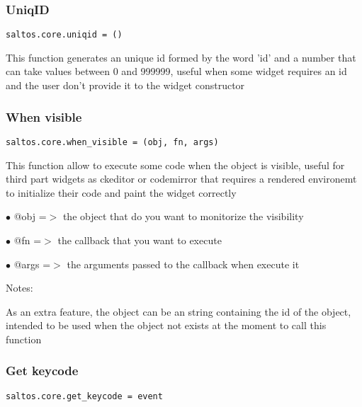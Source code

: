 \documentclass[a4paper]{article}
\begin{document}
\hypertarget{toc697}{}
\subsubsection{UniqID}

\begin{lstlisting}
saltos.core.uniqid = ()
\end{lstlisting}

This function generates an unique id formed by the word 'id' and a number that can take
values between 0 and 999999, useful when some widget requires an id and the user don't
provide it to the widget constructor

\hypertarget{toc698}{}
\subsubsection{When visible}

\begin{lstlisting}
saltos.core.when_visible = (obj, fn, args)
\end{lstlisting}

This function allow to execute some code when the object is visible, useful for third part
widgets as ckeditor or codemirror that requires a rendered environemt to initialize their
code and paint the widget correctly

\begin{compactitem}
\item[\color{myblue}$\bullet$] @obj  =$>$ the object that do you want to monitorize the visibility
\item[\color{myblue}$\bullet$] @fn   =$>$ the callback that you want to execute
\item[\color{myblue}$\bullet$] @args =$>$ the arguments passed to the callback when execute it
\end{compactitem}

Notes:

As an extra feature, the object can be an string containing the id of the object, intended
to be used when the object not exists at the moment to call this function

\hypertarget{toc699}{}
\subsubsection{Get keycode}

\begin{lstlisting}
saltos.core.get_keycode = event
\end{lstlisting}
\end{document}
